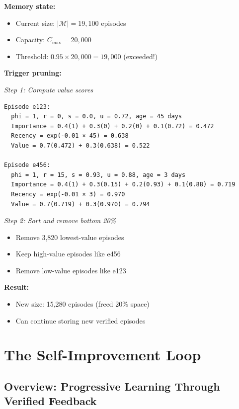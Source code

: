 \documentclass[12pt,a4paper]{article}
\theoremstyle{definition}
\begin{document}
\begin{examplebox}[title=Scenario 2: Capacity Triggered Pruning]

\textbf{Memory state:}
\begin{itemize}
    \item Current size: $|\mathcal{M}| = 19,100$ episodes
    \item Capacity: $C_{\max} = 20,000$
    \item Threshold: $0.95 \times 20,000 = 19,000$ (exceeded!)
\end{itemize}

\textbf{Trigger pruning:}

\textit{Step 1: Compute value scores}

\begin{verbatim}
Episode e123:
  phi = 1, r = 0, s = 0.0, u = 0.72, age = 45 days
  Importance = 0.4(1) + 0.3(0) + 0.2(0) + 0.1(0.72) = 0.472
  Recency = exp(-0.01 × 45) = 0.638
  Value = 0.7(0.472) + 0.3(0.638) = 0.522

Episode e456:
  phi = 1, r = 15, s = 0.93, u = 0.88, age = 3 days
  Importance = 0.4(1) + 0.3(0.15) + 0.2(0.93) + 0.1(0.88) = 0.719
  Recency = exp(-0.01 × 3) = 0.970
  Value = 0.7(0.719) + 0.3(0.970) = 0.794
\end{verbatim}

\textit{Step 2: Sort and remove bottom 20\%}
\begin{itemize}
    \item Remove 3,820 lowest-value episodes
    \item Keep high-value episodes like e456
    \item Remove low-value episodes like e123
\end{itemize}

\textbf{Result:}
\begin{itemize}
    \item New size: 15,280 episodes (freed 20\% space)
    \item Can continue storing new verified episodes
\end{itemize}
\end{examplebox}

\section{The Self-Improvement Loop}

\subsection{Overview: Progressive Learning Through Verified Feedback}
\end{document}
